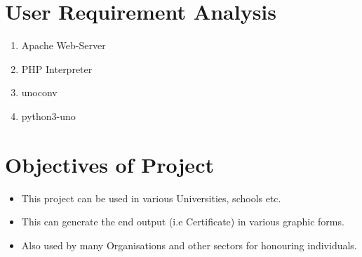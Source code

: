 \section{User Requirement Analysis}
\begin{enumerate}
\item Apache Web-Server
\item PHP Interpreter
\item unoconv
\item python3-uno
\end{enumerate}
\section{Objectives of Project}
\begin{itemize}
\item This project can be used in various Universities, schools etc. 
\item This can generate the end output (i.e Certificate) in various graphic forms.
\item Also used by many Organisations and other sectors for honouring individuals.
\end{itemize}



